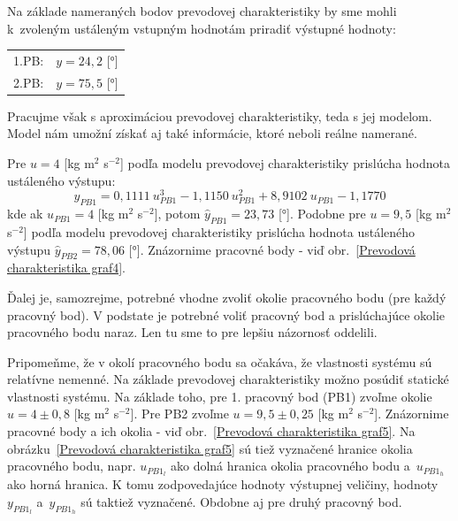 \documentclass[a4paper, 10pt, ]{article}
\begin{document}
Na základe nameraných bodov prevodovej charakteristiky by sme mohli k~zvoleným ustáleným vstupným hodnotám priradiť výstupné hodnoty:

\noindent
\begin{tabular}{@{}l l}
    1.PB: & $y=24,2$ [°] \\
    2.PB: & $y=75,5$ [°]
\end{tabular}


\bigskip

Pracujme však s aproximáciou prevodovej charakteristiky, teda s jej modelom. Model nám umožní získať aj také informácie, ktoré neboli reálne namerané.

Pre $u = 4$ [kg m$^2$ s$^{-2}$] podľa modelu prevodovej charakteristiky prislúcha hodnota ustáleného výstupu:
\begin{equation}
    \hat y_{PB1} = 0,1111\ u_{PB1}^3  -1,1150\ u_{PB1}^2 + 8,9102\ u_{PB1}  -1,1770
\end{equation}
kde ak $u_{PB1} = 4$ [kg m$^2$ s$^{-2}$], potom $\hat y_{PB1} = 23,73$ [°]. Podobne pre $u = 9,5$ [kg m$^2$ s$^{-2}$] podľa modelu prevodovej charakteristiky prislúcha hodnota ustáleného výstupu $\hat y_{PB2} = 78,06$ [°]. Znázornime pracovné body - viď obr.~\ref{Prevodová charakteristika graf4}.






Ďalej je, samozrejme, potrebné vhodne zvoliť okolie pracovného bodu (pre každý pracovný bod). V podstate je potrebné voliť pracovný bod a prislúchajúce okolie pracovného bodu naraz. Len tu sme to pre lepšiu názornosť oddelili.

Pripomeňme, že v okolí pracovného bodu sa očakáva, že vlastnosti systému sú relatívne nemenné. Na základe prevodovej charakteristiky možno posúdiť statické vlastnosti systému. Na základe toho, pre 1. pracovný bod (PB1) zvoľme okolie $u = 4 \pm 0,8$ [kg m$^2$ s$^{-2}$]. Pre PB2 zvoľme $u = 9,5 \pm 0,25$ [kg m$^2$ s$^{-2}$]. Znázornime pracovné body a ich okolia - viď obr.~\ref{Prevodová charakteristika graf5}. Na obrázku~\ref{Prevodová charakteristika graf5} sú tiež vyznačené hranice okolia pracovného bodu, napr. $u_{PB1_l}$ ako dolná hranica okolia pracovného bodu a~$u_{PB1_h}$ ako horná hranica. K tomu zodpovedajúce hodnoty výstupnej veličiny, hodnoty $y_{PB1_l}$ a~$y_{PB1_h}$ sú taktiež vyznačené. Obdobne aj pre druhý pracovný bod.
\end{document}
